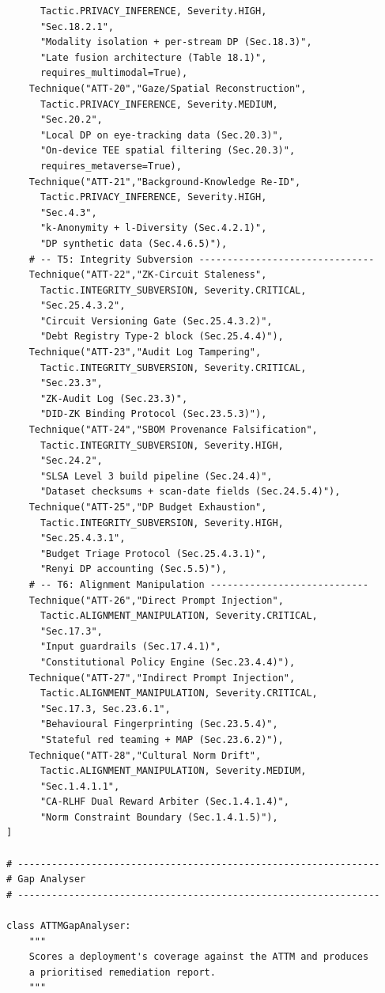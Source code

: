 \begin{lstlisting}
      Tactic.PRIVACY_INFERENCE, Severity.HIGH,
      "Sec.18.2.1",
      "Modality isolation + per-stream DP (Sec.18.3)",
      "Late fusion architecture (Table 18.1)",
      requires_multimodal=True),
    Technique("ATT-20","Gaze/Spatial Reconstruction",
      Tactic.PRIVACY_INFERENCE, Severity.MEDIUM,
      "Sec.20.2",
      "Local DP on eye-tracking data (Sec.20.3)",
      "On-device TEE spatial filtering (Sec.20.3)",
      requires_metaverse=True),
    Technique("ATT-21","Background-Knowledge Re-ID",
      Tactic.PRIVACY_INFERENCE, Severity.HIGH,
      "Sec.4.3",
      "k-Anonymity + l-Diversity (Sec.4.2.1)",
      "DP synthetic data (Sec.4.6.5)"),
    # -- T5: Integrity Subversion -------------------------------
    Technique("ATT-22","ZK-Circuit Staleness",
      Tactic.INTEGRITY_SUBVERSION, Severity.CRITICAL,
      "Sec.25.4.3.2",
      "Circuit Versioning Gate (Sec.25.4.3.2)",
      "Debt Registry Type-2 block (Sec.25.4.4)"),
    Technique("ATT-23","Audit Log Tampering",
      Tactic.INTEGRITY_SUBVERSION, Severity.CRITICAL,
      "Sec.23.3",
      "ZK-Audit Log (Sec.23.3)",
      "DID-ZK Binding Protocol (Sec.23.5.3)"),
    Technique("ATT-24","SBOM Provenance Falsification",
      Tactic.INTEGRITY_SUBVERSION, Severity.HIGH,
      "Sec.24.2",
      "SLSA Level 3 build pipeline (Sec.24.4)",
      "Dataset checksums + scan-date fields (Sec.24.5.4)"),
    Technique("ATT-25","DP Budget Exhaustion",
      Tactic.INTEGRITY_SUBVERSION, Severity.HIGH,
      "Sec.25.4.3.1",
      "Budget Triage Protocol (Sec.25.4.3.1)",
      "Renyi DP accounting (Sec.5.5)"),
    # -- T6: Alignment Manipulation ----------------------------
    Technique("ATT-26","Direct Prompt Injection",
      Tactic.ALIGNMENT_MANIPULATION, Severity.CRITICAL,
      "Sec.17.3",
      "Input guardrails (Sec.17.4.1)",
      "Constitutional Policy Engine (Sec.23.4.4)"),
    Technique("ATT-27","Indirect Prompt Injection",
      Tactic.ALIGNMENT_MANIPULATION, Severity.CRITICAL,
      "Sec.17.3, Sec.23.6.1",
      "Behavioural Fingerprinting (Sec.23.5.4)",
      "Stateful red teaming + MAP (Sec.23.6.2)"),
    Technique("ATT-28","Cultural Norm Drift",
      Tactic.ALIGNMENT_MANIPULATION, Severity.MEDIUM,
      "Sec.1.4.1.1",
      "CA-RLHF Dual Reward Arbiter (Sec.1.4.1.4)",
      "Norm Constraint Boundary (Sec.1.4.1.5)"),
]

# ----------------------------------------------------------------
# Gap Analyser
# ----------------------------------------------------------------

class ATTMGapAnalyser:
    """
    Scores a deployment's coverage against the ATTM and produces
    a prioritised remediation report.
    """


\end{lstlisting}
